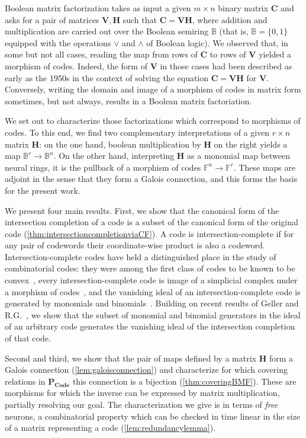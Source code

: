 \documentclass[11pt,letterpaper, reqno]{amsart}
\theoremstyle{definition}
\def\B{\mathbb{B}}
\def\F{\mathbb{F}}
\def\bC{\mathbf{C}}
\def\bH{\mathbf{H}}
\def\bV{\mathbf{V}}
\def\pcode{\mathbf{P_{Code}}}
\begin{document}
Boolean matrix factorization takes as input a given $m\times n$ binary matrix $\bC$ and asks for a pair of matrices $\bV, \bH$ such that $\bC = \bV\bH$, where addition and multiplication are carried out over the Boolean semiring $\B$ (that is, $\B = \{0,1\}$ equipped with the operations $\vee$ and $\wedge$ of Boolean logic). We observed that, in some but not all cases, reading the map from rows of $\bC$ to rows of $\bV$ yielded a morphism of codes.
Indeed, the form of $\bV$ in those cases had been described as early as the 1950s \cites{luce1952note,plemmons1971generalized} in the context of solving the equation $\bC = \bV\bH$ for $\bV$.
Conversely, writing the domain and image of a morphism of codes in matrix form sometimes, but not always, results in a Boolean matrix factoriation.



We set out to characterize those factorizations which correspond to morphisms of codes. To this end, we find two complementary interpretations of a given $r \times n$ matrix $\bH$: on the one hand, boolean multiplication by $\bH$ on the right yields a map $\B^r \to \B^n$. On the other hand, interpreting $\bH$ as a monomial map between neural rings, it is the pullback of a morphism of codes $\F^n \to \F^r$.
These maps are adjoint in the sense that they form a Galois connection, and this forms the basis for the present work.


We present four main results.
First, we show that the canonical form of the intersection completion of a code is a subset of the canonical form of the original code (\cref{thm:intersectioncompletionviaCF}).
A code is intersection-complete if for any pair of codewords their coordinate-wise product is also a codeword.
Intersection-complete codes have held a distinguished place in the study of combinatorial codes: they were among the first class of codes to be known to be convex~\cite{cruz2019open}, every intersection-complete code is image of a simplicial complex under a morphism of codes~\cite{morphisms}, and the vanishing ideal of an intersection-complete code is generated by monomials and binomials~\cite{curto2019algebraic}. Building on recent results of Geller and R.G.~\cite{Geller2024}, we show that the subset of monomial and binomial generators in the ideal of an arbitrary code generates the vanishing ideal of the intersection completion of that code.

Second and third, we show that the pair of maps defined by a matrix $\bH$ form a Galois connection (\cref{lem:galoisconnection}) and characterize for which covering relations in $\pcode$ this connection is a bijection (\cref{thm:coveringBMF}).
These are morphisms for which the inverse can be expressed by matrix multiplication, partially resolving our goal. The characterization we give is in terms of \emph{free} neurons, a combinatorial property which can be checked in time linear in the size of a matrix representing a code (\cref{lem:redundancylemma}).
\end{document}
